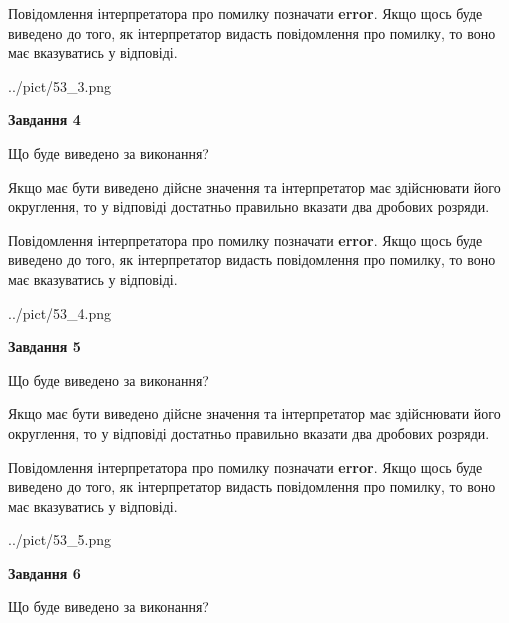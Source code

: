 \documentclass[12pt, ukrainian]{article}
\begin{document}
{\begin {Large}
Повідомлення інтерпретатора про помилку позначати \textbf{error}.
Якщо щось буде виведено до того, як інтерпретатор видасть повідомлення про помилку, 
то воно має вказуватись у відповіді. \par

\begin{center}
	{../pict/53_3.png}
\end{center}
\newpage

{\begin {center}\textbf{Завдання 4}\end {center}}\par
Що буде виведено за виконання? \par

Якщо має бути виведено дійсне значення та інтерпретатор має здійснювати його округлення, 
то у відповіді достатньо правильно вказати два дробових розряди.

Повідомлення інтерпретатора про помилку позначати \textbf{error}.
Якщо щось буде виведено до того, як інтерпретатор видасть повідомлення про помилку, 
то воно має вказуватись у відповіді. \par

\begin{center}
	{../pict/53_4.png}
\end{center}
\newpage

{\begin {center}\textbf{Завдання 5}\end {center}}\par
Що буде виведено за виконання? \par

Якщо має бути виведено дійсне значення та інтерпретатор має здійснювати його округлення, 
то у відповіді достатньо правильно вказати два дробових розряди.

Повідомлення інтерпретатора про помилку позначати \textbf{error}.
Якщо щось буде виведено до того, як інтерпретатор видасть повідомлення про помилку, 
то воно має вказуватись у відповіді. \par

\begin{center}
	{../pict/53_5.png}
\end{center}
\newpage

{\begin {center}\textbf{Завдання 6}\end {center}}\par
Що буде виведено за виконання? \par


\end{Large}}
\end{document}
